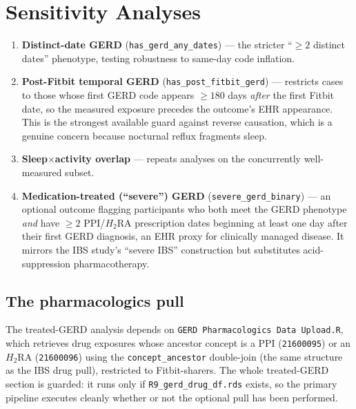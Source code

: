\documentclass[11pt]{article}
\newcommand{\code}[1]{\texttt{\small #1}}
\begin{document}
\section{Sensitivity Analyses}
\label{sec:sensitivity}
\begin{enumerate}[leftmargin=1.6em,itemsep=3pt]
  \item \textbf{Distinct-date GERD} (\code{has_gerd_any_dates}) --- the stricter ``$\geq 2$ distinct dates''
  phenotype, testing robustness to same-day code inflation.
  \item \textbf{Post-Fitbit temporal GERD} (\code{has_post_fitbit_gerd}) --- restricts cases to those
  whose first GERD code appears $\geq 180$ days \emph{after} the first Fitbit date, so the measured
  exposure precedes the outcome's EHR appearance. This is the strongest available guard against reverse
  causation, which is a genuine concern because nocturnal reflux fragments sleep.
  \item \textbf{Sleep$\times$activity overlap} --- repeats analyses on the concurrently well-measured
  subset.
  \item \textbf{Medication-treated (``severe'') GERD} (\code{severe_gerd_binary}) --- an optional
  outcome flagging participants who both meet the GERD phenotype \emph{and} have $\geq 2$ PPI/$H_2$RA
  prescription dates beginning at least one day after their first GERD diagnosis, an EHR proxy for
  clinically managed disease. It mirrors the IBS study's ``severe IBS'' construction but substitutes
  acid-suppression pharmacotherapy.
\end{enumerate}

\subsection{The pharmacologics pull}
The treated-GERD analysis depends on \code{GERD Pharmacologics Data Upload.R}, which retrieves drug
exposures whose ancestor concept is a PPI (\code{21600095}) or an $H_2$RA (\code{21600096}) using the
\code{concept_ancestor} double-join (the same structure as the IBS drug pull), restricted to
Fitbit-sharers. The whole treated-GERD section is guarded: it runs only if \code{R9_gerd_drug_df.rds}
exists, so the primary pipeline executes cleanly whether or not the optional pull has been performed.

\end{document}
